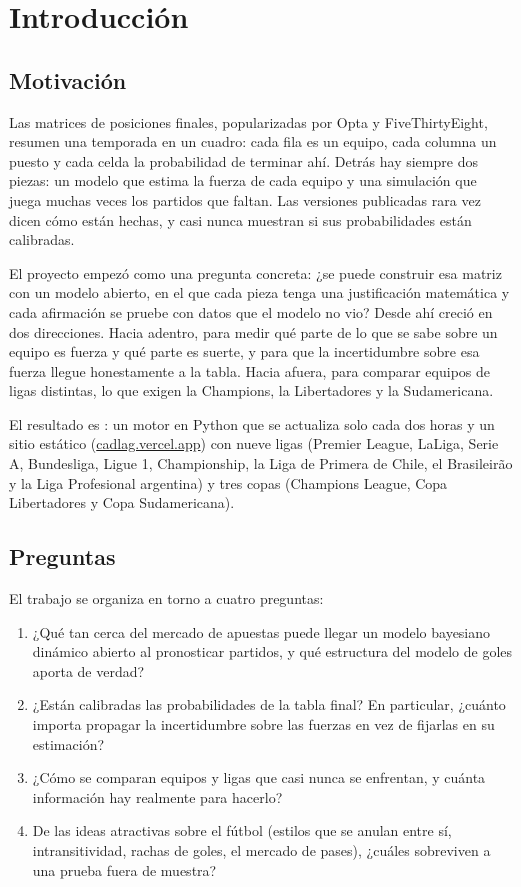 \chapter{Introducción}

\section{Motivación}

Las matrices de posiciones finales, popularizadas por Opta y FiveThirtyEight, resumen una temporada en un cuadro: cada fila es un equipo, cada columna un puesto y cada celda la probabilidad de terminar ahí. Detrás hay siempre dos piezas: un modelo que estima la fuerza de cada equipo y una simulación que juega muchas veces los partidos que faltan. Las versiones publicadas rara vez dicen cómo están hechas, y casi nunca muestran si sus probabilidades están calibradas.

El proyecto empezó como una pregunta concreta: ¿se puede construir esa matriz con un modelo abierto, en el que cada pieza tenga una justificación matemática y cada afirmación se pruebe con datos que el modelo no vio? Desde ahí creció en dos direcciones. Hacia adentro, para medir qué parte de lo que se sabe sobre un equipo es fuerza y qué parte es suerte, y para que la incertidumbre sobre esa fuerza llegue honestamente a la tabla. Hacia afuera, para comparar equipos de ligas distintas, lo que exigen la Champions, la Libertadores y la Sudamericana.

El resultado es \cadlag: un motor en Python que se actualiza solo cada dos horas y un sitio estático (\href{https://cadlag.vercel.app}{cadlag.vercel.app}) con nueve ligas (Premier League, LaLiga, Serie A, Bundesliga, Ligue 1, Championship, la Liga de Primera de Chile, el Brasileirão y la Liga Profesional argentina) y tres copas (Champions League, Copa Libertadores y Copa Sudamericana).

\section{Preguntas}

El trabajo se organiza en torno a cuatro preguntas:

\begin{enumerate}[label=\textsf{\bfseries\color{cdblue}P\arabic*.}]
\item ¿Qué tan cerca del mercado de apuestas puede llegar un modelo bayesiano dinámico abierto al pronosticar partidos, y qué estructura del modelo de goles aporta de verdad?
\item ¿Están calibradas las probabilidades de la tabla final? En particular, ¿cuánto importa propagar la incertidumbre sobre las fuerzas en vez de fijarlas en su estimación?
\item ¿Cómo se comparan equipos y ligas que casi nunca se enfrentan, y cuánta información hay realmente para hacerlo?
\item De las ideas atractivas sobre el fútbol (estilos que se anulan entre sí, intransitividad, rachas de goles, el mercado de pases), ¿cuáles sobreviven a una prueba fuera de muestra?
\end{enumerate}

